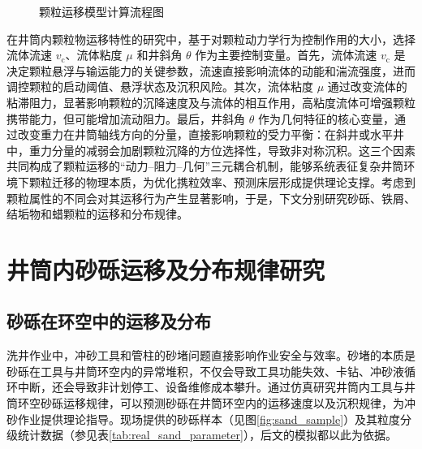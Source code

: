 \begin{figure}[htbp]
        \caption{颗粒运移模型计算流程图}
        \label{fig:flowchart}  
    \end{figure}


在井筒内颗粒物运移特性的研究中，基于对颗粒动力学行为控制作用的大小，选择流体流速 \(v_{\mathrm{c}}\)、流体粘度 \(\mu\) 和井斜角 \(\theta\) 作为主要控制变量。首先，流体流速 \(v_{\mathrm{c}}\) 是决定颗粒悬浮与输运能力的关键参数，流速直接影响流体的动能和湍流强度，进而调控颗粒的启动阈值、悬浮状态及沉积风险。其次，流体粘度 \(\mu\) 通过改变流体的粘滞阻力，显著影响颗粒的沉降速度及与流体的相互作用，高粘度流体可增强颗粒携带能力，但可能增加流动阻力。最后，井斜角 \(\theta\) 作为几何特征的核心变量，通过改变重力在井筒轴线方向的分量，直接影响颗粒的受力平衡：在斜井或水平井中，重力分量的减弱会加剧颗粒沉降的方位选择性，导致非对称沉积。这三个因素共同构成了颗粒运移的“动力--阻力--几何”三元耦合机制，能够系统表征复杂井筒环境下颗粒迁移的物理本质，为优化携粒效率、预测床层形成提供理论支撑。考虑到颗粒属性的不同会对其运移行为产生显著影响，于是，下文分别研究砂砾、铁屑、结垢物和蜡颗粒的运移和分布规律。

\section{井筒内砂砾运移及分布规律研究}

\subsection{砂砾在环空中的运移及分布}

洗井作业中，冲砂工具和管柱的砂堵问题直接影响作业安全与效率。砂堵的本质是砂砾在工具与井筒环空内的异常堆积，不仅会导致工具功能失效、卡钻、冲砂液循环中断，还会导致非计划停工、设备维修成本攀升。通过仿真研究井筒内工具与井筒环空砂砾运移规律，可以预测砂砾在井筒环空内的运移速度以及沉积规律，为冲砂作业提供理论指导。现场提供的砂砾样本（见图\ref{fig:sand_sample}）及其粒度分级统计数据（参见表\ref{tab:real_sand_parameter}），后文的模拟都以此为依据。

